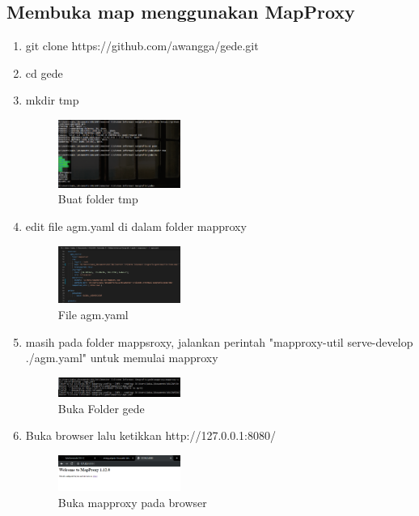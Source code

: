 \subsection{Membuka map menggunakan MapProxy}
\begin{enumerate}
  \item git clone https://github.com/awangga/gede.git
  \item cd gede
  \item mkdir tmp
  \hfill\break
  \begin{figure}[H]
  \includegraphics[width=4cm]{figures/tugas4/1174067/7.png}
  \centering
  \caption{Buat folder tmp}
  \end{figure}

  \item edit file agm.yaml di dalam folder mapproxy
  \hfill\break
  \begin{figure}[H]
  \includegraphics[width=4cm]{figures/tugas4/1174067/8.png}
  \centering
  \caption{File agm.yaml}
  \end{figure}

  \item masih pada folder mappsroxy, jalankan perintah "mapproxy-util serve-develop ./agm.yaml" untuk memulai mapproxy
  \hfill\break
  \begin{figure}[H]
  \includegraphics[width=4cm]{figures/tugas4/1174067/9,5.png}
  \centering
  \caption{Buka Folder gede}
  \end{figure}

  \item Buka browser lalu ketikkan http://127.0.0.1:8080/
  \hfill\break
  \begin{figure}[H]
  \includegraphics[width=4cm]{figures/tugas4/1174067/9,6.png}
  \centering
  \caption{Buka mapproxy pada browser}
  \end{figure}


\end{enumerate}
